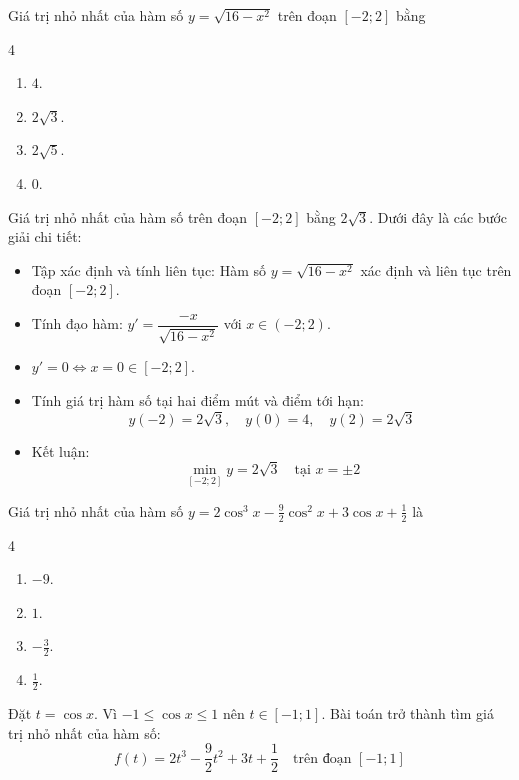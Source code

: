 \begin{baitap}
	Giá trị nhỏ nhất của hàm số $y = \sqrt{16 - x^2}$ trên đoạn $[-2; 2]$ bằng
	\begin{multicols}{4}
		\begin{enumerate}
			\item $4$.
			\item $2\sqrt{3}$.
			\item $2\sqrt{5}$.
			\item $0$.
		\end{enumerate}
	\end{multicols}
	\begin{traloi}
		 Giá trị nhỏ nhất của hàm số trên đoạn $[-2; 2]$ bằng $2\sqrt{3}$. Dưới đây là các bước giải chi tiết:		
		\begin{itemize}
			\item Tập xác định và tính liên tục:  Hàm số $y = \sqrt{16 - x^2}$ xác định và liên tục trên đoạn $[-2; 2]$.
			\item Tính đạo hàm: $y' = \dfrac{-x}{\sqrt{16 - x^2}}$ với $x \in (-2; 2)$.
			\item  $y' = 0 \iff x = 0 \in [-2; 2]$.
			\item Tính giá trị hàm số tại hai điểm mút và điểm tới hạn:
			$$y(-2) = 2\sqrt{3},\quad y(0) =4, \quad y(2) = 2\sqrt{3}$$
			\item Kết luận: $$\min\limits_{[-2; 2]} y = 2\sqrt{3} \quad \text{tại } x = \pm 2$$
		\end{itemize}
	\end{traloi}
\end{baitap}
\begin{baitap}
	Giá trị nhỏ nhất của hàm số $y = 2 \cos^3 x - \frac{9}{2} \cos^2 x + 3 \cos x + \frac{1}{2}$ là
	\begin{multicols}{4}
		\begin{enumerate}
			\item $-9$.
			\item $1$.
			\item $-\frac{3}{2}$.
			\item $\frac{1}{2}$.
		\end{enumerate}
	\end{multicols}
	\begin{traloi}
		  Đặt $t = \cos x$. Vì $-1 \le \cos x \le 1$ nên $t \in [-1; 1]$. 	Bài toán trở thành tìm giá trị nhỏ nhất của hàm số:
		$$f(t) = 2t^3 - \frac{9}{2}t^2 + 3t + \frac{1}{2} \quad \text{trên đoạn } [-1; 1]$$
	\end{traloi}
\end{baitap}

